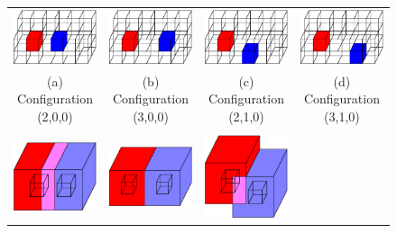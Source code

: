 \begin{figure}[t]
\centering
\begin{tabular}{cccc}
\includegraphics[width=1.2in]{images/config3D_2_0_0.eps} \qquad &
\qquad
\includegraphics[width=1.2in]{images/config3D_3_0_0.eps}
\qquad &
\qquad
\includegraphics[width=1.2in]{images/config3D_2_1_0.eps}
\qquad &
\qquad
\includegraphics[width=1.2in]{images/config3D_3_1_0.eps} \\
(a) Configuration (2,0,0) & (b) Configuration (3,0,0) 
  & (c) Configuration (2,1,0) & (d) Configuration (3,1,0) \\
\\
\includegraphics[width=1.2in]{images/config3D_2_0_0_3x3x3.eps} \qquad &
\qquad
\includegraphics[width=1.2in]{images/config3D_3_0_0_3x3x3.eps}
\qquad &
\qquad
\includegraphics[width=1.2in]{images/config3D_2_1_0_3x3x3.eps}

\end{tabular}
\end{figure}
